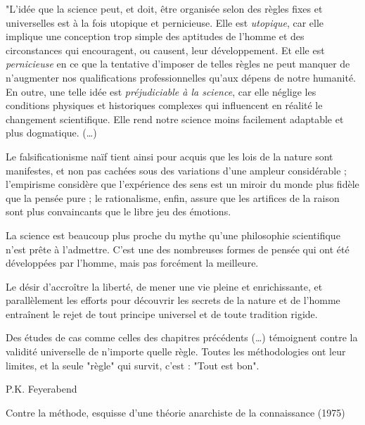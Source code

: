 \thispagestyle{preface}
\begin{tirade}
"L’idée que la science peut, et doit, être organisée selon des règles fixes et
universelles est à la fois utopique et pernicieuse. Elle est \emph{utopique},
car elle implique une conception trop simple des aptitudes de l’homme et des
circonstances qui encouragent, ou causent, leur développement. Et elle est
\emph{pernicieuse} en ce que la tentative d’imposer de telles règles ne peut
manquer de n’augmenter nos qualifications professionnelles qu’aux dépens de notre
humanité.
En outre, une telle idée est \emph{préjudiciable à la science}, car elle néglige
les conditions physiques et historiques complexes qui influencent en réalité le
changement scientifique. Elle rend notre science moins facilement adaptable et
plus dogmatique. (\ldots)


Le falsificationisme naïf tient ainsi pour acquis que les lois de la nature
sont manifestes, et non pas cachées sous des variations d’une ampleur
considérable ; l’empirisme considère que l’expérience des sens est un miroir du
monde plus fidèle que la pensée pure ; le rationalisme, enfin, assure que les
artifices de la raison sont plus convaincants que le libre jeu des émotions.


La science est beaucoup plus proche du mythe qu’une philosophie scientifique
n’est prête à l’admettre. C’est une des nombreuses formes de pensée qui ont été
développées par l’homme, mais pas forcément la meilleure.


Le désir d’accroître la liberté, de mener une vie pleine et enrichissante, et
parallèlement les efforts pour découvrir les secrets de la nature et de l’homme
entraînent le rejet de tout principe universel et de toute tradition rigide.


Des études de cas comme celles des chapitres précédents (\ldots)
témoignent contre la validité universelle de n'importe quelle règle. Toutes les
méthodologies ont leur limites, et la seule "règle" qui survit, c'est : "Tout
est bon".
\end{tirade}
\hfill P.K. Feyerabend

\hfill\footnotesize  Contre la méthode, esquisse d’une théorie anarchiste de la
 connaissance (1975)
